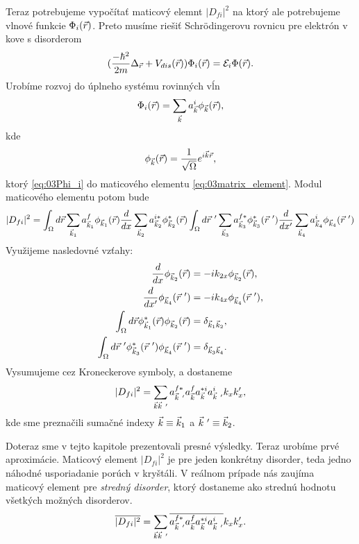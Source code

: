 Teraz potrebujeme vypočítať maticový elemnt $|D_{fi}|^2$ na ktorý ale potrebujeme vlnové funkcie $\Phi_i(\vec{r})$. Preto musíme riešiť Schr\"odingerovu rovnicu pre elektrón v kove s disorderom
\begin{align}
\label{eq:03SchrDis}
(\frac{-\hbar^2}{2m}\Delta_{\vec{r}} + V_{dis}(\vec{r}))\Phi_i(\vec{r})=\mathcal{E}_i\Phi(\vec{r})  \text{.}
\end{align}
Urobíme rozvoj do úplneho systému rovinných vĺn
\begin{align}
\label{eq:03Phi_i}
\Phi_i(\vec{r})=\sum_{\vec{k}}a^i_{\vec{k}}\phi_{\vec{k}}(\vec{r})\text{,}\\
\end{align}
kde
\begin{align}
\label{eq:03rov}
\phi_{\vec{k}}(\vec{r})=\frac{1}{\sqrt \Omega}e^{i\vec{k}\vec{r}}\text{,}
\end{align}
ktorý \eqref{eq:03Phi_i} do maticového elementu \eqref{eq:03matrix_element}. Modul maticového elementu potom bude
\begin{align}
\label{eq:03dfisquared}
|D_{fi}|^2=\int_\Omega d\vr \sum_{\vk_1}a_{\vk_1}^f\phi_{\vk_1}(\vr)\frac{d}{dx}\sum_{\vk_2}a_{\vk_2}^{i*}\phi_{\vk_2}^*(\vr)\int_\Omega d\vr\ ' \sum_{\vk_3}a_{\vk_3}^{f*}\phi_{\vk_3}^*(\vr\ ')\frac{d}{dx'}\sum_{\vk_4}a_{\vk_4}^i \phi_{\vk_4}(\vr\ ')
\end{align}
Využijeme nasledovné vzťahy:
\begin{align*}
\frac{d}{dx}\phi_{\vk_2}(\vr)&=-ik_{2x}\phi_{\vk_2}(\vr)\text{,}\\
\frac{d}{dx'}\phi_{\vk_4}(\vr\ ')&=-ik_{4x}\phi_{\vk_4}(\vr\ ')\text{,}\\
\int_\Omega d\vr \phi_{\vk_1}^*(\vr)\phi_{\vk_2}(\vr)&=\delta_{\vk_1\vk_2}\text{,}\\
\int_\Omega d\vr\ '\phi_{\vk_3}^*(\vr\ ')\phi_{\vk_4}(\vr\ ')&=\delta_{\vk_3\vk_4} \text{.}
\end{align*}
Vysumujeme cez Kroneckerove symboly, a dostaneme
\begin{align}
|D_{fi}|^2=\sum_{\vk\vk\ '} a^{f*}_{\vk\ '}a^f_{\vk}a^{*i}_{\vk}a^i_{\vk\ '}k_xk_x' \text{,}
\end{align}
kde sme preznačili sumačné indexy $\vec{k}\equiv \vec{k}_1$ a $\vec{k}\ '\equiv \vec{k}_2$.

Doteraz sme v tejto kapitole prezentovali presné výsledky. Teraz urobíme prvé aproximácie. Maticový element $|D_{fi}|^2$ je pre jeden konkrétny disorder, teda jedno náhodné usporiadanie porúch v kryštáli. V reálnom prípade nás zaujíma maticový element pre {\it stredný disorder}, ktorý dostaneme ako strednú hodnotu všetkých možných disorderov.
\begin{align}
\label{eq:03dfisq2}
\overline{|D_{fi}|^2}=\sum_{\vk\vk\ '}\overline{a^{f*}_{\vk\ '}a^f_{\vk}a^{*i}_{\vk}a^i_{\vk\ '}}k_xk_x' \text{.} 
\end{align}

